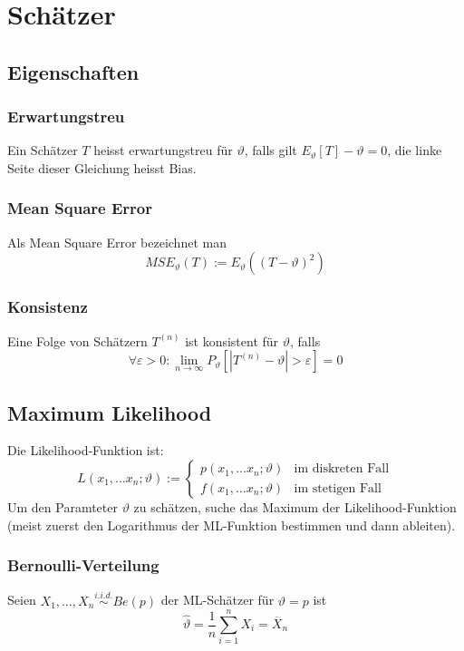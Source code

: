 \documentclass[a4paper,titlepage]{article}
\newcommand{\abs}[1]{\left\vert #1 \right\vert}
\begin{document}
\section{Schätzer}

\subsection{Eigenschaften}
\subsubsection{Erwartungstreu}
Ein Schätzer $T$ heisst erwartungstreu für $\vartheta$, falls gilt $E_\vartheta[T]-\vartheta = 0$, die linke Seite dieser Gleichung heisst Bias.

\subsubsection{Mean Square Error}
Als Mean Square Error bezeichnet man
$$
MSE_\vartheta(T) := E_\vartheta\left((T-\vartheta)^2\right)
$$
\subsubsection{Konsistenz}
Eine Folge von Schätzern $T^{(n)}$ ist konsistent für $\vartheta$, falls 
$$
\forall \varepsilon > 0: \lim_{n \to \infty} P_\vartheta \left[ \abs{T^{(n)} - \vartheta} > \varepsilon\right] = 0  
$$
\subsection{Maximum Likelihood}
Die Likelihood-Funktion ist:
\begin{equation*}
L(x_1, \dots x_n ; \vartheta) := 
\begin{cases}
p(x_1, \dots x_n ; \vartheta) & \text{im diskreten Fall} \\
f(x_1, \dots x_n ; \vartheta) & \text{im stetigen Fall}
\end{cases}
\end{equation*}
Um den Paramteter $\vartheta$ zu schätzen, suche das Maximum der Likelihood-Funktion (meist zuerst den Logarithmus der ML-Funktion bestimmen und dann ableiten).

\subsubsection{Bernoulli-Verteilung}
Seien $X_1, \dots, X_n \overset{i.i.d.}{\sim} Be(p)$ der ML-Schätzer für $\vartheta = p$ ist 
\begin{equation*}
\hat{\vartheta} = \frac{1}{n}\sum_{i=1}^n X_i = \overline{X}_n
\end{equation*}
\end{document}
